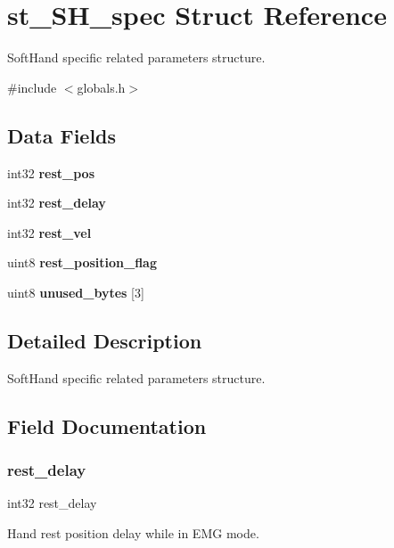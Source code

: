 \section{st\+\_\+\+S\+H\+\_\+spec Struct Reference}
\label{structst___s_h__spec}


Soft\+Hand specific related parameters structure.  




{\ttfamily \#include $<$globals.\+h$>$}

\subsection*{Data Fields}
\begin{DoxyCompactItemize}
\item 
int32 \textbf{ rest\+\_\+pos}
\item 
int32 \textbf{ rest\+\_\+delay}
\item 
int32 \textbf{ rest\+\_\+vel}
\item 
uint8 \textbf{ rest\+\_\+position\+\_\+flag}
\item 
uint8 \textbf{ unused\+\_\+bytes} [3]
\end{DoxyCompactItemize}


\subsection{Detailed Description}
Soft\+Hand specific related parameters structure. 



\subsection{Field Documentation}
\mbox{\label{structst___s_h__spec_a0c8e71bf78005976d2887594a9808eda}} 
\subsubsection{rest\+\_\+delay}
{\footnotesize\ttfamily int32 rest\+\_\+delay}

Hand rest position delay while in E\+MG mode. \mbox{\label{structst___s_h__spec_a27742da1d6ad36d8051848f9e4346146}} 

